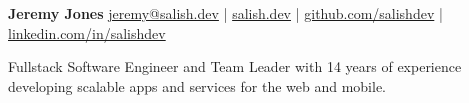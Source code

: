 \documentclass{resume} %
\begin{document}
\begingroup

\vspace*{-1em} %
{\Huge \textbf{Jeremy Jones}} \hfill
\vspace*{-1em}
\normalsize{\href{mailto:jeremy@salish.dev}{jeremy@salish.dev} %
| \href{https://salish.dev}{salish.dev} %
| \href{https://github.com/salishdev}{github.com/salishdev} %
| \href{https://linkedin.com/in/salishdev}{linkedin.com/in/salishdev}} %
\nameskip\break
\endgroup




  Fullstack Software Engineer and Team Leader with 14 years of experience developing scalable apps and services for the web and mobile.
\end{document}
